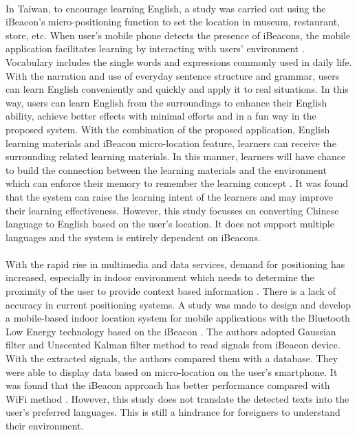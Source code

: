 \documentclass[12pt]{article}
\begin{document}
\paragraph{}In Taiwan, to encourage learning English, a study was carried out using the iBeacon's micro-positioning function to set the location in museum, restaurant, store, etc. When user's mobile phone detects the presence of iBeacons, the mobile application facilitates learning by interacting with users' environment \cite{taiwan}. Vocabulary includes the single words and expressions commonly used in daily life. With the narration and use of everyday sentence structure and grammar, users can learn English conveniently and quickly and apply it to real situations. In this way, users can learn English from the surroundings to enhance their English ability, achieve better effects with minimal efforts and in a fun way in the proposed system. With the combination of the proposed application, English learning materials and iBeacon micro-location feature, learners can receive the surrounding related learning materials. In this manner, learners will have chance to build the connection between the learning materials and the environment which can enforce their memory to remember the learning concept \cite{taiwan}. It was found that the system can raise the learning intent of the learners and may improve their learning effectiveness. However, this study focusses on converting Chinese language to English based on the user's location. It does not support multiple languages and the system is entirely dependent on iBeacons.

\paragraph{} With the rapid rise in multimedia and data services, demand for positioning has increased, especially in indoor environment which needs to determine the proximity  of the user to provide context based information \cite{services}. There is a lack of accuracy in current positioning systems. A study was made to design and develop a mobile-based indoor location system for mobile applications with the Bluetooth Low Energy technology based on the iBeacon \cite{indoor}. The authors adopted Gaussian filter and Unscented Kalman filter method to read signals from iBeacon device. With the extracted signals, the authors compared them with a database. They were able to display data based on micro-location on the user's smartphone.  It was found that the iBeacon approach has better performance compared with WiFi method  \cite{indoor}. However, this study does not translate the detected texts into the user's preferred languages. This is still a hindrance for foreigners to understand their environment.
\end{document}
